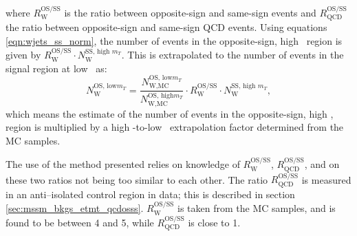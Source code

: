where $R_{\text{W}}^{\text{OS/SS}}$ is the ratio between opposite-sign and same-sign \Wjets events
and $R_{\text{QCD}}^{\text{OS/SS}}$ the ratio between opposite-sign and same-sign QCD events. Using 
equations \ref{eqn:wjets_ss_norm}, the number of \Wjets events in the
opposite-sign, high \mT~region is given by $R_{\text{W}}^{\text{OS/SS}}\cdot N_{\text{W}}^{\text{SS, high } m_{T}}$. 
This is extrapolated to the number of \Wjets events in the signal region at low \mT~as:
\begin{equation}\label{eqn:wjets_os_norm}
N_{\text{W}}^{\text{OS, low} m_{T}} = \frac{N_{\text{W,MC}}^{\text{OS, low} m_{T}}}{N_{\text{W,MC}}^{\text{OS, high} m_{T}}}\cdot R_{\text{W}}^{\text{OS/SS}} \cdot N_{\text{W}}^{\text{SS, high }m_{T}},
\end{equation}
which means the estimate of the number of \Wjets events in the opposite-sign, high \mT, region
is multiplied by a high \mT-to-low \mT~extrapolation factor determined from the \ac{MC} samples.

The use of the method presented relies on knowledge of $R_{\text{W}}^{\text{OS/SS}}$,
$R_{\text{QCD}}^{\text{OS/SS}}$, and on these two ratios not being too similar to each other. 
The ratio $R_{\text{QCD}}^{\text{OS/SS}}$ is measured in an anti--isolated
control region in data; this is described in section \ref{sec:mssm_bkgs_etmt_qcdosss}. $R_{\text{W}}^{\text{OS/SS}}$ is 
taken from the \Wjets \ac{MC} samples, and is found to be between 4 and 5, while $R_{\text{QCD}}^{\text{OS/SS}}$
is close to 1.

